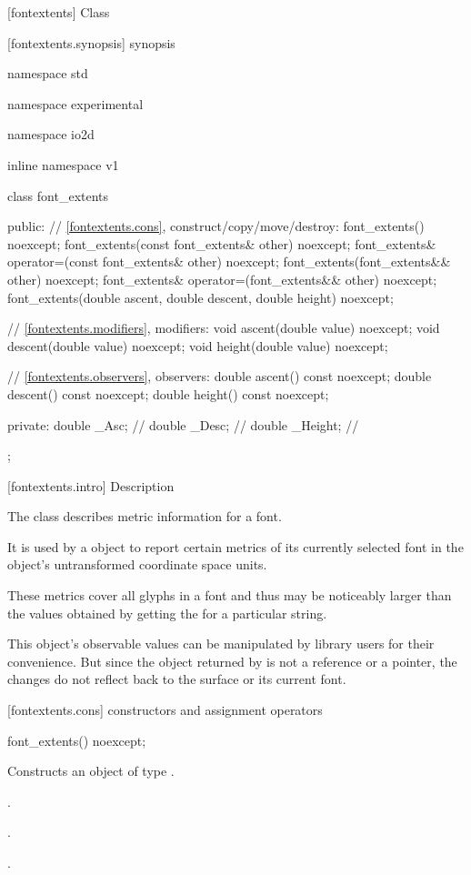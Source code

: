 [fontextents] {Class }

 [fontextents.synopsis] { synopsis}

\begin{codeblock}
namespace std { namespace experimental { namespace io2d { inline namespace v1 {
  class font_extents {
  public:
    // \ref{fontextents.cons}, construct/copy/move/destroy:
    font_extents() noexcept;
    font_extents(const font_extents& other) noexcept;
    font_extents& operator=(const font_extents& other) noexcept;
    font_extents(font_extents&& other) noexcept;
    font_extents& operator=(font_extents&& other) noexcept;
    font_extents(double ascent, double descent, double height) noexcept;

    // \ref{fontextents.modifiers}, modifiers:
    void ascent(double value) noexcept;
    void descent(double value) noexcept;
    void height(double value) noexcept;

    // \ref{fontextents.observers}, observers:
    double ascent() const noexcept;
    double descent() const noexcept;
    double height() const noexcept;

  private:
    double _Asc;    // \expos
    double _Desc;   // \expos
    double _Height; // \expos
  };
} } } }
\end{codeblock}

 [fontextents.intro] { Description}

\pnum
{}
The class  describes metric information for a font.

\pnum
It is used by a  object to report certain metrics of its currently selected font in the  object's untransformed coordinate space units.

\pnum
These metrics cover all glyphs in a font and thus may be noticeably larger than the values obtained by getting the  for a particular string.

\pnum
\enternote
This object's observable values can be manipulated by library users for their convenience. But since the  object returned by  is not a reference or a pointer, the changes do not reflect back to the surface or its current font.
\exitnote

 [fontextents.cons] { constructors and assignment operators}

\begin{itemdecl}
    font_extents() noexcept;
\end{itemdecl}
\begin{itemdescr}
	\pnum
	\effects
	Constructs an object of type .
	
	\pnum
	\postconditions
	.
	
	.
	
	.
\end{itemdescr}

